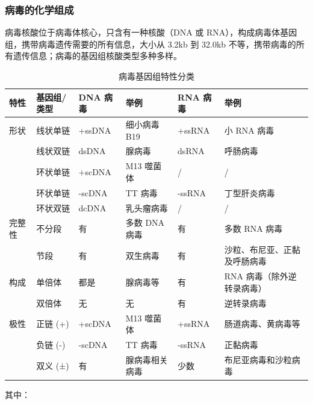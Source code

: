 \documentclass[9pt,a4paper,twoside]{rho-class/rho}
\begin{document}
    \subsubsection{病毒的化学组成}

    病毒核酸位于病毒体核心，只含有一种核酸（DNA 或 RNA），构成病毒体基因组，携带病毒遗传需要的所有信息，大小从 3.2kb 到 32.0kb 不等，携带病毒的所有遗传信息；病毒的基因组核酸类型多种多样。

    \begin{table}[H]
        \centering
        \caption{病毒基因组特性分类}
        \label{tab:virus_genome}
        \begin{tabular}{@{}llllll@{}}
        \toprule
        \textbf{特性} & \textbf{基因组/类型} & \textbf{DNA 病毒} & \textbf{举例} & \textbf{RNA 病毒} & \textbf{举例} \\
        \midrule
        形状 & 线状单链 & +ssDNA & 细小病毒 B19 & +ssRNA & 小 RNA 病毒 \\
            & 线状双链 & dsDNA & 腺病毒 & dsRNA & 呼肠病毒 \\
            & 环状单链 & +scDNA & M13 噬菌体 & / & / \\
            & 环状单链 & -scDNA & TT 病毒 & -ssRNA & 丁型肝炎病毒 \\
            & 环状双链 & dcDNA & 乳头瘤病毒 & / & / \\
        \midrule
        完整性 & 不分段 & 有 & 多数 DNA 病毒 & 有 & 多数 RNA 病毒 \\
               & 节段 & 有 & 双生病毒 & 有 & 沙粒、布尼亚、正黏及呼肠病毒 \\
        \midrule
        构成 & 单倍体 & 都是 & 腺病毒等 & 有 & RNA 病毒（除外逆转录病毒） \\
             & 双倍体 & 无 & 无 & 有 & 逆转录病毒 \\
        \midrule
        极性 & 正链 (+) & +scDNA & M13 噬菌体 & +ssRNA & 肠道病毒、黄病毒等 \\
             & 负链 (-) & -scDNA & TT 病毒 & -ssRNA & 正黏病毒 \\
             & 双义 (±) & 有 & 腺病毒相关病毒 & 少数 & 布尼亚病毒和沙粒病毒 \\
        \bottomrule
        \end{tabular}
    \end{table}

    其中：
\end{document}
